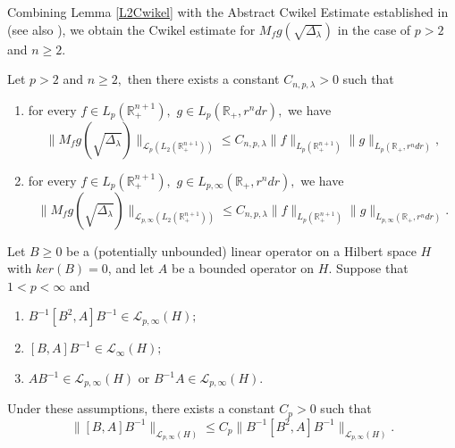 \documentclass[12pt]{amsart}
\begin{document}
Combining  Lemma \ref{L2Cwikel} with the Abstract Cwikel Estimate established in \cite{LeSZ} (see also \cite[Theorem 1.5.10]{LSZ2}), we obtain the Cwikel estimate for $M_fg(\sqrt{\Delta_{\lambda}})$ in the case of $p>2$ and $n\geq 2.$

\begin{theorem}\label{cwikel estimate in bessel setting}
Let $p>2$ and $n\geq 2,$ then there exists a constant $C_{n,p,\lambda}>0$ such that
\begin{enumerate}[{\rm (i)}]
\item for every $f\in L_p(\mathbb{R}_+^{n+1}),$ $g\in L_p(\mathbb{R}_+,r^ndr),$  we have
$$\|M_fg(\sqrt{\Delta_{\lambda}})\|_{\mathcal{L}_p(L_2(\mathbb{R}_+^{n+1}))}\leq C_{n,p,\lambda}\|f\|_{L_p(\mathbb{R}_+^{n+1})}\|g\|_{L_{p}(\mathbb{R}_+,r^ndr)},$$
\item for every $f\in L_p(\mathbb{R}_+^{n+1}),$ $g\in L_{p,\infty}(\mathbb{R}_+,r^ndr),$ we have
$$\|M_fg(\sqrt{\Delta_{\lambda}})\|_{\mathcal{L}_{p,\infty}(L_2(\mathbb{R}_+^{n+1}))}\leq C_{n,p,\lambda}\|f\|_{L_p(\mathbb{R}_+^{n+1})}\|g\|_{L_{p,\infty}(\mathbb{R}_+,r^ndr)}.$$
\end{enumerate}
\end{theorem}


%

\begin{lemma}\cite[Lemma 4.4]{MR4654013}\label{surprisingly_technical_lemma}
Let $B\geq 0$ be a (potentially unbounded) linear operator on a Hilbert space $H$ with $ker(B)=0$, and let $A$ be a bounded operator on $H$. Suppose that $1<p<\infty$ and
\begin{enumerate}[{\rm (i)}]
\item $B^{-1}[B^2,A]B^{-1}\in\mathcal{L}_{p,\infty}(H);$
\item $[B,A]B^{-1}\in\mathcal{L}_{\infty}(H);$
\item $AB^{-1}\in\mathcal{L}_{p,\infty}(H)$ or $B^{-1}A\in\mathcal{L}_{p,\infty}(H).$
\end{enumerate}
Under these assumptions, there exists a constant $C_p>0$ such that
$$\|[B,A]B^{-1}\|_{\mathcal{L}_{p,\infty}(H)} \leq C_p\|B^{-1}[B^2,A]B^{-1}\|_{\mathcal{L}_{p,\infty}(H)}.$$
\end{lemma}
\end{document}
